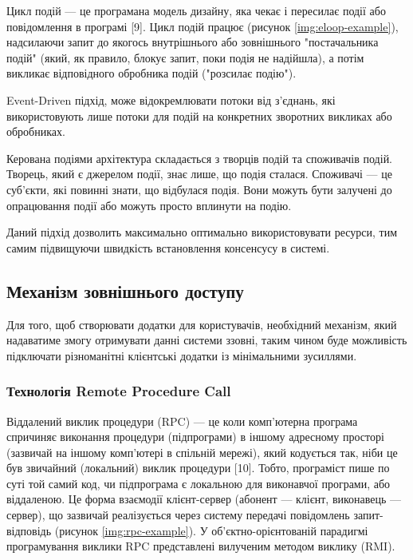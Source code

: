\documentclass{lib/styles/default-style}
\begin{document}
    Цикл подій --- це програмана модель дизайну, яка чекає і пересилає події або повідомлення в програмі [9].
    Цикл подій працює (рисунок \ref{img:eloop-example}), надсилаючи запит до якогось внутрішнього або зовнішнього "постачальника подій"
    (який, як правило, блокує запит, поки подія не надійшла), а потім викликає відповідного обробника подій ("розсилає подію").

    Event-Driven підхід, може відокремлювати потоки від з'єднань,
    які використовують лише потоки для подій на конкретних зворотних викликах або обробниках.


    Керована подіями архітектура складається з творців подій та споживачів подій.
    Творець, який є джерелом події, знає лише, що подія сталася.
    Споживачі --- це суб'єкти, які повинні знати, що відбулася подія.
    Вони можуть бути залучені до опрацювання події або можуть просто вплинути на подію.

    Даний підхід дозволить максимально оптимально використовувати ресурси, тим самим підвищуючи швидкість встановлення консенсусу в системі.

\subsection{Механізм зовнішнього доступу}

    Для того, щоб створювати додатки для користувачів, необхідний механізм, який надаватиме змогу отримувати данні системи ззовні,
    таким чином буде можливість підключати різноманітні клієнтські додатки із мінімальними зусиллями.

    \subsubsection{Технологія Remote Procedure Call}

    Віддалений виклик процедури (RPC) --- це коли комп'ютерна програма спричиняє виконання процедури (підпрограми) в
    іншому адресному просторі (зазвичай на іншому комп’ютері в спільній мережі),
    який кодується так, ніби це був звичайний (локальний) виклик процедури [10].
    Тобто, програміст пише по суті той самий код, чи підпрограма є локальною для виконавчої програми, або віддаленою.
    Це форма взаємодії клієнт-сервер (абонент --- клієнт, виконавець --- сервер), що зазвичай реалізується через систему передачі
    повідомлень запит-відповідь (рисунок \ref{img:rpc-example}). У об'єктно-орієнтованій парадигмі програмування виклики RPC
    представлені вилученим методом виклику (RMI).
\end{document}
